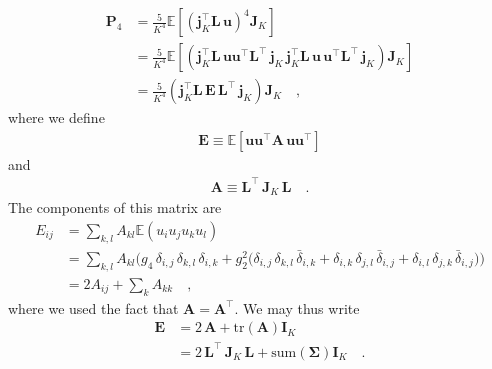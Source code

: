 \documentclass[modern]{aastex62}
\begin{document}
\begin{align}
    \mathbf{P}_4 & = \frac{5}{K^4}\mathbb{E}\left[ \left(\mathbf{j}_K^\top \mathbf{L} \, \mathbf{u}\right)^4 \mathbf{J}_K \right]
    \nonumber                                                                                                                                                                                                                                                                        \\
                 & = \frac{5}{K^4}\mathbb{E}\left[\left(\mathbf{j}_K^\top \mathbf{L} \,  \mathbf{u} \mathbf{u}^\top  \mathbf{L}^\top \, \mathbf{j}_K \, \mathbf{j}_K^\top \mathbf{L} \,  \mathbf{u} \, \mathbf{u}^\top  \mathbf{L}^\top \, \mathbf{j}_K \right) \mathbf{J}_K \right]
    \nonumber                                                                                                                                                                                                                                                                        \\
                 & = \frac{5}{K^4}\left(\mathbf{j}_K^\top \mathbf{L} \, \mathbf{E} \, \mathbf{L}^\top \, \mathbf{j}_K \right) \mathbf{J}_K
    \quad,
\end{align}
%
where we define
%
\begin{align}
    \mathbf{E} \equiv \mathbb{E}\left[ \mathbf{u} \mathbf{u}^\top  \mathbf{A} \,  \mathbf{u} \mathbf{u}^\top \right]
\end{align}
%
and
%
\begin{align}
    \mathbf{A} \equiv \mathbf{L}^\top \, \mathbf{J}_K \, \mathbf{L}
    \quad.
\end{align}
%
The components of this matrix are
%
\begin{align}
    E_{ij} & =
    \sum\limits_{k,l}A_{kl} \mathbb{E}(u_i u_j u_k u_l)
    \nonumber  \\
           & =
    \sum\limits_{k,l}A_{kl}
    \Big(
    g_4 \, \delta_{i, j} \, \delta_{k, l} \, \delta_{i, k}
    +
    g_2^2 \big(
        \delta_{i, j} \, \delta_{k, l} \, \bar{\delta}_{i, k}
        +
        \delta_{i, k} \, \delta_{j, l} \, \bar{\delta}_{i, j}
        +
        \delta_{i, l} \, \delta_{j, k} \, \bar{\delta}_{i, j}
        \big)
    \Big)
    \nonumber  \\
           & =
    2 A_{ij} + \sum\limits_k A_{kk}
    \quad,
\end{align}
%
where we used the fact that $\mathbf{A} = \mathbf{A}^\top$. We may thus write
%
\begin{align}
    \mathbf{E} & =
    2 \, \mathbf{A} + \mathrm{tr}(\mathbf{A}) \mathbf{I}_K
    \nonumber      \\
               & =
    2 \, \mathbf{L}^\top \, \mathbf{J}_K \, \mathbf{L} + \mathrm{sum}(\pmb{\Sigma}) \mathbf{I}_K
    \quad.
\end{align}
\end{document}
